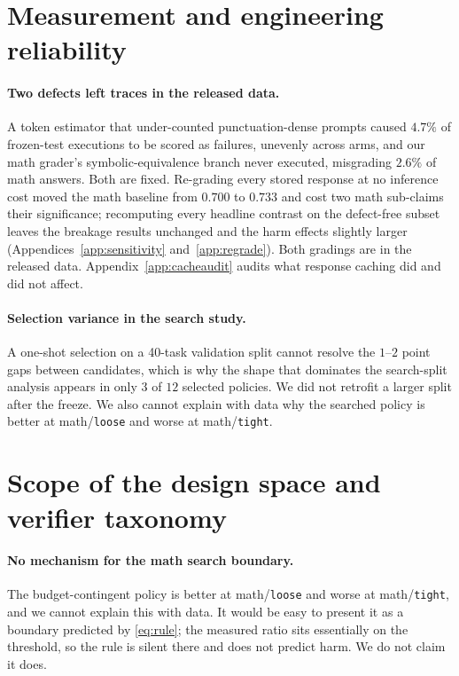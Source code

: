 \documentclass{article}
\begin{document}
\section{Measurement and engineering reliability}
\label{app:reliability}

\paragraph{Two defects left traces in the released data.} A token estimator that
under-counted punctuation-dense prompts caused $4.7\%$ of frozen-test executions
to be scored as failures, unevenly across arms, and our math grader's
symbolic-equivalence branch never executed, misgrading $2.6\%$ of math answers.
Both are fixed. Re-grading every stored response at no inference cost moved the
math baseline from $0.700$ to $0.733$ and cost two math sub-claims their
significance; recomputing every headline contrast on the defect-free subset
leaves the breakage results unchanged and the harm effects slightly larger
(Appendices~\ref{app:sensitivity} and~\ref{app:regrade}). Both gradings are in
the released data. Appendix~\ref{app:cacheaudit} audits what response caching
did and did not affect.

\paragraph{Selection variance in the search study.} A one-shot selection on a
40-task validation split cannot resolve the $1$--$2$ point gaps between
candidates, which is why the shape that dominates the search-split analysis
appears in only $3$ of $12$ selected policies. We did not retrofit a larger
split after the freeze. We also cannot explain with data why the searched policy
is better at math/\texttt{loose} and worse at math/\texttt{tight}.

\section{Scope of the design space and verifier taxonomy}
\label{app:scope}

\paragraph{No mechanism for the math search boundary.} The budget-contingent
policy is better at math/\texttt{loose} and worse at math/\texttt{tight}, and we
cannot explain this with data. It would be easy to present it as a boundary
predicted by \eqref{eq:rule}; the measured ratio sits essentially on the
threshold, so the rule is silent there and does not predict harm. We do not
claim it does.
\end{document}
